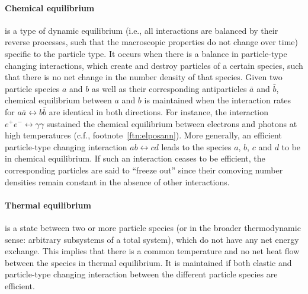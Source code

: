 \paragraph{Chemical equilibrium} is a type of dynamic equilibrium (i.e., all interactions are balanced by their reverse processes, such that the macroscopic properties do not change over time) specific to the particle type. It occurs when there is a balance in particle-type changing interactions, which create and destroy particles of a certain species, such that there is no net change in the number density of that species.   Given two particle species $a$ and $b$ as well as their corresponding antiparticles $\bar{a}$ and $\bar{b}$, chemical equilibrium between $a$ and $b$ is maintained when the interaction rates for $a \bar{a} \leftrightarrow b \bar{b}$ are identical in both directions. For instance, the interaction $e^+ e^- \leftrightarrow \gamma \gamma$  sustained the chemical equilibrium between electrons and photons at high temperatures (c.f., footnote~\ref{ftn:elposann}). More generally, an efficient particle-type changing interaction $ab \leftrightarrow cd$ leads to the species $a$, $b$, $c$ and $d$ to be in chemical equilibrium. If such an interaction ceases to be efficient, the corresponding particles are said to ``freeze out'' since their comoving number densities remain constant in the absence of other interactions.

\paragraph{Thermal equilibrium} is a state between two or more particle species (or in the broader thermodynamic sense: arbitrary subsystems of a total system), which do not have any net energy exchange. This implies that there is a common temperature and no net heat flow between the species in thermal equilibrium. It is maintained if both elastic and particle-type changing interaction between the different particle species are efficient.

